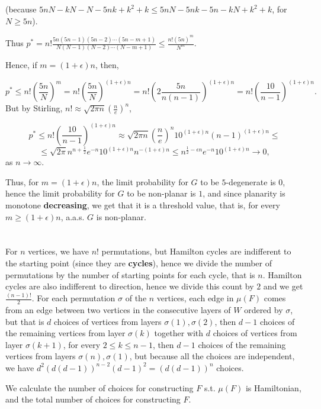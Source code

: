 \documentclass{article}
\begin{document}
(because $5nN-kN-N-5nk+k^2+k\leq5nN-5nk-5n-kN+k^2+k$, for $N\geq5n$).

Thus $p^\ast=n!\frac{5n(5n-1)(5n-2)\cdots(5n-m+1)}{N(N-1)(N-2)\cdots(N-m+1)}\leq\frac{n!(5n)^m}{N^m}$.

Hence, if $m=(1+\epsilon)n$, then,

\[
p^\ast\leq{n!(\frac{5n}{N})^m}=n!(\frac{5n}{N})^{(1+\epsilon)n}=n!(2\frac{5n}{n(n-1)})^{(1+\epsilon)n}=n!(\frac{10}{n-1})^{(1+\epsilon)n}.
\]
But by Stirling, $n!\approx\sqrt{2\pi{n}}(\frac{n}{e})^n$,

\[p^\ast\leq{n!(\frac{10}{n-1})^{(1+\epsilon)n}}\approx\sqrt{2\pi{n}}(\frac{n}{e})^n10^{(1+\epsilon)n}(n-1)^{(1+\epsilon)n}\leq\]\[\leq\sqrt{2\pi}n^{n+\frac{1}{2}}e^{-n}10^{(1+\epsilon)n}n^{-(1+\epsilon)n}\leq{n^{\frac{1}{2}-\epsilon{n}}e^{-n}10^{(1+\epsilon)n}}\rightarrow{0},
\]
as $n\rightarrow\infty$.

Thus, for $m=(1+\epsilon)n$, the limit probability for $G$ to be $5$-degenerate is {0}, hence the limit probability for $G$ to be non-planar is $1$, and since planarity is monotone \textbf{decreasing}, we get that it is a threshold value, that is, for every $m\geq(1+\epsilon)n$, a.a.s. $G$ is non-planar.
\section{}
\subsection{}
For $n$ vertices, we have $n!$ permutations, but Hamilton cycles are indifferent to the starting point (since they are \textbf{cycles}), hence we divide the number of permutations by the number of starting points for each cycle, that is $n$. Hamilton cycles are also indifferent to direction, hence we divide this count by $2$ and we get $\frac{(n-1)!}{2}$. For each permutation $\sigma$ of the $n$ vertices, each edge in $\mu(F)$ comes from an edge between two vertices in the consecutive layers of $W$ ordered by $\sigma$, but that is $d$ choices of vertices from layers $\sigma(1),\sigma(2)$, then $d-1$ choices of the remaining vertices from layer $\sigma(k)$ together with $d$ choices of vertices from layer $\sigma(k+1)$, for every $2\leq{k}\leq{n-1}$, then $d-1$ choices of the remaining vertices from layers $\sigma(n),\sigma(1)$, but because all the choices are independent, we have $d^2(d(d-1))^{n-2}(d-1)^2=(d(d-1))^n$ choices.

We calculate the number of choices for constructing $F$ s.t. $\mu(F)$ is Hamiltonian, and the total number of choices for constructing $F$.
\end{document}
